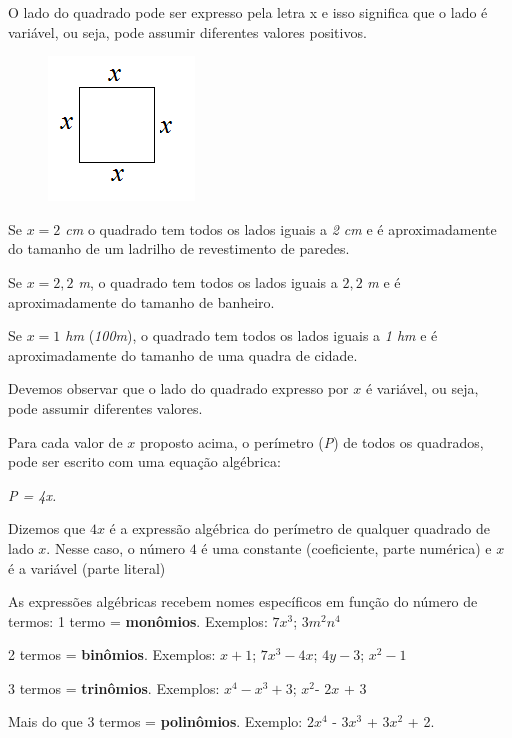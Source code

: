 \begin{texemplo}

O lado do quadrado pode ser expresso pela letra  x  e isso significa que o lado é variável, ou seja, pode assumir diferentes valores positivos.

\begin{figure}[H]
\includegraphics{capitulos/expressoes_algebricas/media/image2.png}
\centering
\end{figure}

Se \textit{$x = 2$ cm} o quadrado tem todos os lados iguais a \textit{2 cm} e é aproximadamente do tamanho de um ladrilho de revestimento de paredes.

Se \textit{$x = 2,2$ m}, o quadrado tem todos os lados iguais a $2,2$ \textit{m} e é aproximadamente do tamanho de banheiro.

Se \textit{$x = 1$ hm} (\textit{100m}), o quadrado tem todos os lados iguais a \textit{1 hm} e é aproximadamente do tamanho de uma quadra de cidade.

Devemos observar que o lado do quadrado expresso por $x$ é variável, ou seja, pode assumir diferentes valores.

Para cada valor de $x$ proposto acima, o perímetro (\textit{P}) de todos os quadrados, pode ser escrito com uma equação algébrica:

\begin{center}
\textit{P = 4x.}
\end{center}

Dizemos que $4x$ é a expressão algébrica do perímetro de qualquer quadrado de lado $x$. Nesse caso, o número $4$ é uma constante (coeficiente, parte numérica) e $x$ é a variável (parte literal) \qedsymbol

As expressões algébricas recebem nomes específicos em função do número de termos:
1 termo = \textbf{monômios}. Exemplos: $7x^3$; $3m^2n^4$\par
2 termos = \textbf{binômios}. Exemplos:  $x+1$; $7x^3 -4x$; $4y - 3$; $x^2 - 1$\par
3 termos = \textbf{trinômios}. Exemplos: $x^4 - x^3 + 3$; $x^2$- $2x$ + 3\par
Mais do que 3 termos = \textbf{polinômios}. Exemplo: $2x^4$ - $3x^3$ + $3x^2$ + 2.
\end{texemplo}

